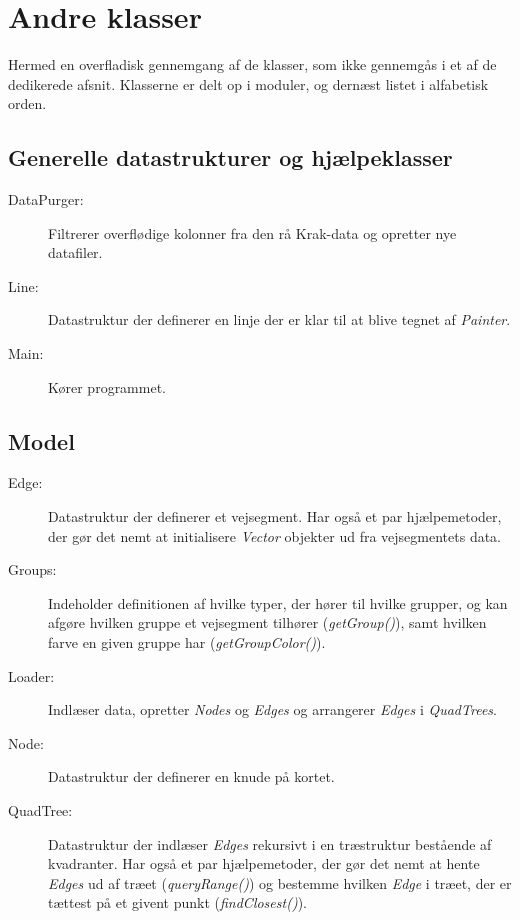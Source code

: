 \section{Andre klasser}

Hermed en overfladisk gennemgang af de klasser, som ikke gennemgås i et af de dedikerede afsnit. Klasserne er delt op i moduler, og dernæst listet i alfabetisk orden.

\subsection{Generelle datastrukturer og hjælpeklasser}

\begin{description}
	\item[DataPurger:] Filtrerer overflødige kolonner fra den rå Krak-data og opretter nye datafiler.
	\item[Line:] Datastruktur der definerer en linje der er klar til at blive tegnet af \emph{Painter}.
	\item[Main:] Kører programmet.
\end{description}

\subsection{Model}

\begin{description}
	\item[Edge:] Datastruktur der definerer et vejsegment. Har også et par hjælpemetoder, der gør det nemt at initialisere \emph{Vector} objekter ud fra vejsegmentets data.
	\item[Groups:] Indeholder definitionen af hvilke typer, der hører til hvilke grupper, og kan afgøre hvilken gruppe et vejsegment tilhører (\emph{getGroup()}), samt hvilken farve en given gruppe har (\emph{getGroupColor()}).
	\item[Loader:] Indlæser data, opretter \emph{Nodes} og \emph{Edges} og arrangerer \emph{Edges} i \emph{QuadTrees}.
	\item[Node:] Datastruktur der definerer en knude på kortet.
	\item[QuadTree:] Datastruktur der indlæser \emph{Edges} rekursivt i en træstruktur bestående af kvadranter. Har også et par hjælpemetoder, der gør det nemt at hente \emph{Edges} ud af træet (\emph{queryRange()}) og bestemme hvilken \emph{Edge} i træet, der er tættest på et givent punkt (\emph{findClosest()}).
\end{description}

